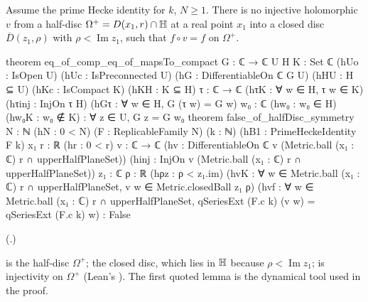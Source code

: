 \begin{theorem}\label{ch19:thm:boundary}
Assume the prime Hecke identity for $k$, $N\ge1$.  There is no injective holomorphic $v$ from a half-disc $\Omega^+=D(x_1,r)\cap\mathbb{H}$
at a real point $x_1$ into a closed disc $\overline D(z_1,\rho)$ with $\rho<\operatorname{Im}z_1$, such that $f\circ v=f$ on $\Omega^+$.
\end{theorem}
\begin{leancode}
theorem eq_of_comp_eq_of_mapsTo_compact {G : ℂ → ℂ} {U H K : Set ℂ} (hUo : IsOpen U)
    (hUc : IsPreconnected U) (hG : DifferentiableOn ℂ G U) (hHU : H ⊆ U) (hKc : IsCompact K)
    (hKH : K ⊆ H) {τ : ℂ → ℂ} (hτK : ∀ w ∈ H, τ w ∈ K) (hτinj : InjOn τ H)
    (hGτ : ∀ w ∈ H, G (τ w) = G w) {w₀ : ℂ} (hw₀ : w₀ ∈ H) (hw₀K : w₀ ∉ K) :
    ∀ z ∈ U, G z = G w₀
theorem false_of_halfDisc_symmetry {N : ℕ} (hN : 0 < N) (F : ReplicableFamily N) (k : ℕ)
    (hB1 : PrimeHeckeIdentity F k) {x₁ r : ℝ} (hr : 0 < r) {v : ℂ → ℂ}
    (hv : DifferentiableOn ℂ v (Metric.ball (x₁ : ℂ) r ∩ upperHalfPlaneSet))
    (hinj : InjOn v (Metric.ball (x₁ : ℂ) r ∩ upperHalfPlaneSet)) {z₁ : ℂ} {ρ : ℝ}
    (hρz : ρ < z₁.im)
    (hvK : ∀ w ∈ Metric.ball (x₁ : ℂ) r ∩ upperHalfPlaneSet, v w ∈ Metric.closedBall z₁ ρ)
    (hvf : ∀ w ∈ Metric.ball (x₁ : ℂ) r ∩ upperHalfPlaneSet,
      qSeriesExt (F.c k) (v w) = qSeriesExt (F.c k) w) : False
\end{leancode}
(.)
\begin{dictionary}
 is the half-disc $\Omega^+$;  the closed disc, which lies in
$\mathbb{H}$ because $\rho<\operatorname{Im}z_1$;  is injectivity on $\Omega^+$ (Lean's ).  The first quoted lemma is the dynamical tool
used in the proof.
\end{dictionary}
